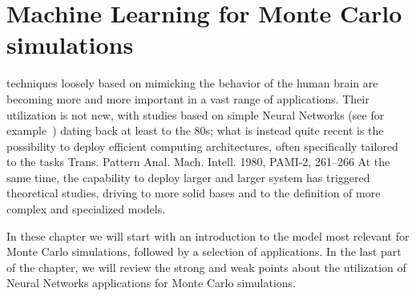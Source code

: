 \chapter{Machine Learning for Monte Carlo simulations}
 techniques loosely based on mimicking the behavior of the human brain are becoming more and more important in a vast range of applications.
Their utilization is not new, with studies based on simple Neural Networks (see for example~\cite{nn1,nn2,nn3}) dating back at least to the 80s; what is instead quite recent is the possibility to deploy efficient computing architectures, often specifically tailored to the tasks
Trans. Pattern Anal. Mach. Intell. 1980, PAMI-2, 261–266
At the same time, the capability to deploy larger and larger system has triggered theoretical studies, driving to more solid bases and to  the definition of more complex and specialized models.

In these chapter we will start with an introduction to the model most relevant for Monte Carlo simulations, followed by a selection of applications. In the last part of the chapter, we will review the strong and weak points about the utilization of Neural Networks applications for Monte Carlo simulations.
